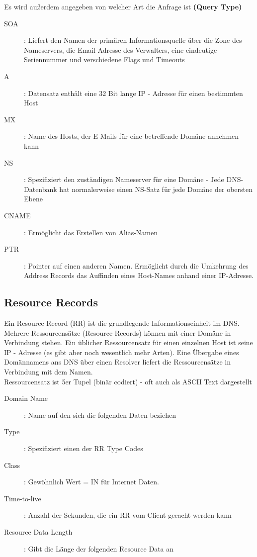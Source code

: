 \documentclass{article} %
\begin{document}
Es wird außerdem angegeben von welcher Art die Anfrage ist \textbf{(Query Type)}
	\begin{description}
	\item[SOA]:  Liefert den Namen der primären Informationsquelle über die Zone des Nameservers, die Email-Adresse des Verwalters, eine eindeutige Seriennummer und verschiedene Flags und Timeouts
	\item[A]: Datensatz enthält eine 32 Bit lange IP - Adresse für einen bestimmten Host 
	\item[MX]: Name des Hosts, der E-Mails für eine betreffende Domäne annehmen kann 
	\item[NS]: Spezifiziert den zuständigen Nameserver für eine Domäne - Jede DNS-Datenbank hat normalerweise einen NS-Satz für jede Domäne der obersten Ebene 
	\item[CNAME]: Ermöglicht das Erstellen von Alias-Namen 
	\item[PTR]: Pointer auf einen anderen Namen. Ermöglicht durch die Umkehrung des Address Records das Auffinden eines Host-Names anhand einer IP-Adresse. 
	\end{description}
	
\subsection{Resource Records}
Ein Resource Record (RR) ist die grundlegende Informationseinheit im DNS.
Mehrere Ressourcensätze (Resource Records) können mit einer Domäne in Verbindung stehen. Ein üblicher Ressourcensatz für einen einzelnen Host ist seine IP - Adresse (es gibt aber noch wesentlich mehr Arten). Eine Übergabe eines Domännamens ans DNS über einen Resolver liefert die Ressourcensätze in Verbindung mit dem Namen.\\


\noindent Ressourcensatz ist 5er Tupel (binär codiert) - oft auch als ASCII Text dargestellt 
	\begin{description}
	\item[Domain Name]: Name auf den sich die folgenden Daten beziehen 
	\item[Type]: Spezifiziert einen der RR Type Codes
	\item[Class]: Gewöhnlich Wert = IN für Internet Daten.
	\item[Time-to-live]: Anzahl der Sekunden, die ein RR vom Client gecacht werden kann 
	\item[Resource Data Length]: Gibt die Länge der folgenden Resource Data an 
	\end{description}
\end{document}
